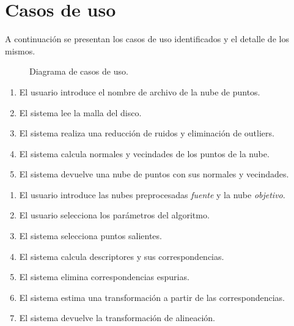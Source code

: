 \chapter{Casos de uso}
A continuación se presentan los casos de uso identificados y el detalle de los mismos.

\begin{figure}
%		
	\caption{\label{fig:casos_de_uso}Diagrama de casos de uso.}
\end{figure}

		\CUNormal
		\begin{enumerate}
			\item El usuario introduce el nombre de archivo de la nube de puntos.
			\item El sistema lee la malla del disco.
			\item El sistema realiza una reducción de ruidos y eliminación de outliers.
			\item El sistema calcula normales y vecindades de los puntos de la nube.
			\item El sistema devuelve una nube de puntos con sus normales y vecindades.
		\end{enumerate}

		\CUNormal
		\begin{enumerate}
			\item El usuario introduce las nubes preprocesadas \emph{fuente} y la nube \emph{objetivo}. 
			\item El usuario selecciona los parámetros del algoritmo.
			\item El sistema selecciona puntos salientes.
			\item El sistema calcula descriptores y sus correspondencias.
			\item El sistema elimina correspondencias espurias.
			\item El sistema estima una transformación a partir de las correspondencias.
			\item El sistema devuelve la transformación de alineación.
		\end{enumerate}

